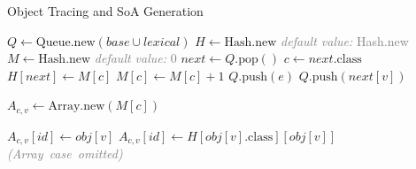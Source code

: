 \documentclass[preprint]{sigplanconf}
\begin{document}
\begin{algorithm}[!h]
\caption{Object Tracing and SoA Generation}
\label{CHalgorithm}
\begin{algorithmic}[1]
\State $\mathit{Q} \gets \mbox{Queue.new}(\mathit{base} \cup \mathit{lexical})$
\State $H \gets \mbox{Hash.new}$ \hfill \textcolor{gray}{\textit{default value:} Hash.new}
\State $M \gets \mbox{Hash.new}$ \hfill \textcolor{gray}{\textit{default value:} 0}
    \State $\mathit{next} \gets Q.\mbox{pop}()$
    \State $c \gets \mathit{next}.\mbox{class}$
        \State $H[\mathit{next}] \gets M[c]$
        \State $M[c] \gets M[c] + 1$
                \State $Q.\mbox{push}(e)$
            \EndFor
        \Else
                \State $Q.\mbox{push}(\mathit{next}[v])$
            \EndFor
        \EndIf
    \EndIf
\EndWhile

        \State $A_{c,v} \gets \mbox{Array.new}(M[c])$
    \EndFor

                \State $A_{c,v}[\mathit{id}] \gets \mathit{obj}[v]$
            \Else
                \State $A_{c,v}[\mathit{id}] \gets H[\mathit{obj}[v].\mbox{class}][\mathit{obj}[v]]$
            \EndIf
        \EndFor
    \EndFor
\EndFor
\State \mbox{\textit{\textcolor{gray}{(Array case omitted)}}}
%

\EndProcedure
\end{algorithmic}
\end{algorithm}



\end{document}
